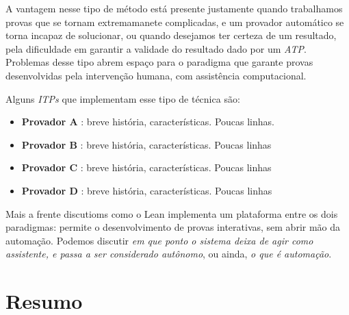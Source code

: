 A vantagem nesse tipo de método está presente justamente quando trabalhamos provas que se tornam extremamanete complicadas, e um provador automático se torna incapaz de solucionar, ou quando desejamos ter certeza de um resultado, pela dificuldade em garantir a validade do resultado dado por um \textit{ATP}.
Problemas desse tipo abrem espaço para o paradigma que garante provas desenvolvidas pela intervenção humana, com assistência computacional.

Alguns \textit{ITPs} que implementam esse tipo de técnica são:

\begin{itemize}
    \item \textbf{Provador A} : breve história, características. Poucas linhas.
    \item \textbf{Provador B} : breve história, características. Poucas linhas
    \item \textbf{Provador C} : breve história, características. Poucas linhas
    \item \textbf{Provador D} : breve história, características. Poucas linhas
\end{itemize}

Mais a frente discutioms como o Lean implementa um plataforma entre os dois paradigmas: permite o desenvolvimento de provas interativas, sem abrir mão da automação.
Podemos discutir \textit{em que ponto o sistema deixa de agir como assistente, e passa a ser considerado autônomo}, ou ainda, \textit{o que é automação}.



\section{Resumo}
